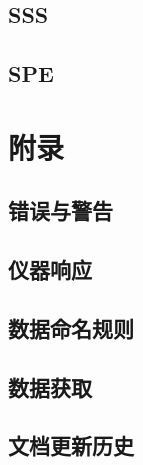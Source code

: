 \chapter{SSS}





















\chapter{SPE}












\part{附录}
\appendix
\chapter{错误与警告}







\chapter{仪器响应}
\label{chap:resp}




\chapter{数据命名规则}
\label{chap:naming}


\chapter{数据获取}



\chapter{文档更新历史}
\label{chap:changelog}



